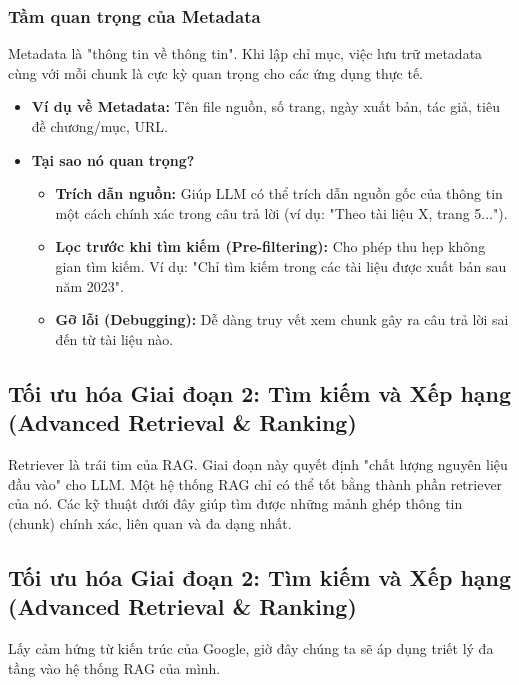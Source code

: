 \subsubsection{Tầm quan trọng của Metadata}
Metadata là "thông tin về thông tin". Khi lập chỉ mục, việc lưu trữ metadata cùng với mỗi chunk là cực kỳ quan trọng cho các ứng dụng thực tế.
\begin{itemize}
    \item \textbf{Ví dụ về Metadata:} Tên file nguồn, số trang, ngày xuất bản, tác giả, tiêu đề chương/mục, URL.
    \item \textbf{Tại sao nó quan trọng?}
    \begin{itemize}
        \item \textbf{Trích dẫn nguồn:} Giúp LLM có thể trích dẫn nguồn gốc của thông tin một cách chính xác trong câu trả lời (ví dụ: "Theo tài liệu X, trang 5...").
        \item \textbf{Lọc trước khi tìm kiếm (Pre-filtering):} Cho phép thu hẹp không gian tìm kiếm. Ví dụ: "Chỉ tìm kiếm trong các tài liệu được xuất bản sau năm 2023".
        \item \textbf{Gỡ lỗi (Debugging):} Dễ dàng truy vết xem chunk gây ra câu trả lời sai đến từ tài liệu nào.
    \end{itemize}
\end{itemize}

\subsection{Tối ưu hóa Giai đoạn 2: Tìm kiếm và Xếp hạng (Advanced Retrieval \& Ranking)}
\label{ssec:advanced_retrieval_ranking}
\begin{tcolorbox}[title=Mục tiêu, colback=blue!5!white, colframe=blue!75!black]
Retriever là trái tim của RAG. Giai đoạn này quyết định "chất lượng nguyên liệu đầu vào" cho LLM. Một hệ thống RAG chỉ có thể tốt bằng thành phần retriever của nó. Các kỹ thuật dưới đây giúp tìm được những mảnh ghép thông tin (chunk) chính xác, liên quan và đa dạng nhất.
\end{tcolorbox}

\subsection{Tối ưu hóa Giai đoạn 2: Tìm kiếm và Xếp hạng (Advanced Retrieval \& Ranking)}
\label{ssec:advanced_retrieval_ranking_refactored}
Lấy cảm hứng từ kiến trúc của Google, giờ đây chúng ta sẽ áp dụng triết lý đa tầng vào hệ thống RAG của mình.

